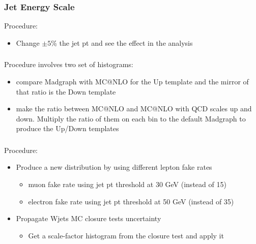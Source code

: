 \subsubsection{Jet Energy Scale}
Procedure:
  \begin{itemize}
    \item Change $\pm5$\% the jet pt and see the effect in the analysis
  \end{itemize}

\subsubsection{\WW{}}
Procedure involves two set of histograms:
  \begin{itemize}
    \item compare Madgraph with MC@NLO for the Up template and the mirror of that ratio is the Down template
    \item make the ratio between MC@NLO and MC@NLO with QCD scales up and down. Multiply the ratio of them on each bin to the default Madgraph to produce the Up/Down templates
  \end{itemize}

\subsubsection{\wjets{}}
Procedure:
  \begin{itemize}
    \item Produce a new distribution by using different lepton fake rates
      \begin{itemize}
        \item muon fake rate using jet pt threshold at 30 GeV (instead of 15)
        \item electron fake rate using jet pt threshold at 50 GeV (instead of 35)
      \end{itemize}
   \item Propagate Wjets MC closure tests uncertainty
      \begin{itemize}
        \item Get a scale-factor histogram from the closure test and apply it
      \end{itemize}
  \end{itemize}

